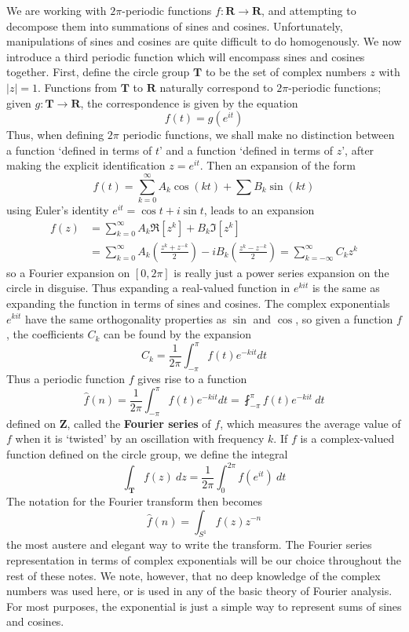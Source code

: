 We are working with $2 \pi$-periodic functions $f: \mathbf{R} \to \mathbf{R}$, and attempting to decompose them into summations of sines and cosines. Unfortunately, manipulations of sines and cosines are quite difficult to do homogenously. We now introduce a third periodic function which will encompass sines and cosines together. First, define the circle group $\mathbf{T}$ to be the set of complex numbers $z$ with $|z| = 1$. Functions from $\mathbf{T}$ to $\mathbf{R}$ naturally correspond to $2 \pi$-periodic functions; given $g: \mathbf{T} \to \mathbf{R}$, the correspondence is given by the equation
%
\[ f(t) = g(e^{it}) \]
%
Thus, when defining $2\pi$ periodic functions, we shall make no distinction between a function `defined in terms of $t$' and a function `defined in terms of $z$', after making the explicit identification $z = e^{it}$. Then an expansion of the form
%
\[ f(t) = \sum_{k = 0}^\infty A_k \cos(kt) + \sum B_k \sin(kt) \]
%
using Euler's identity $e^{it} = \cos t + i \sin t$, leads to an expansion
%
\begin{align*}
    f(z) &= \sum_{k = 0}^\infty A_k \Re[z^k] + B_k \Im[z^k]\\
    &= \sum_{k = 0}^\infty A_k \left( \frac{z^k + z^{-k}}{2} \right) - i B_k \left( \frac{z^k - z^{-k}}{2} \right) = \sum_{k = -\infty}^\infty C_k z^k
\end{align*}
%
so a Fourier expansion on $[0,2\pi]$ is really just a power series expansion on the circle in disguise. Thus expanding a real-valued function in $e^{kit}$ is the same as expanding the function in terms of sines and cosines. The complex exponentials $e^{kit}$ have the same orthogonality properties as $\sin$ and $\cos$, so given a function $f$, the coefficients $C_k$ can be found by the expansion
%
\[ C_k = \frac{1}{2\pi} \int_{-\pi}^\pi f(t) e^{-kit} dt \]
%
Thus a periodic function $f$ gives rise to a function
%
\[ \widehat{f}(n) = \frac{1}{2\pi} \int_{-\pi}^\pi f(t) e^{-kit} dt = \fint_{-\pi}^\pi f(t) e^{-kit}\ dt \]
%
defined on $\mathbf{Z}$, called the {\bf Fourier series} of $f$, which measures the average value of $f$ when it is `twisted' by an oscillation with frequency $k$. If $f$ is a complex-valued function defined on the circle group, we define the integral
%
\[ \int_{\mathbf{T}} f(z)\ dz = \frac{1}{2\pi} \int_0^{2\pi} f(e^{it})\ dt \]
%
The notation for the Fourier transform then becomes
%
\[ \widehat{f}(n) = \int_{S^1} f(z) z^{-n} \]
%
the most austere and elegant way to write the transform. The Fourier series representation in terms of complex exponentials will be our choice throughout the rest of these notes. We note, however, that no deep knowledge of the complex numbers was used here, or is used in any of the basic theory of Fourier analysis. For most purposes, the exponential is just a simple way to represent sums of sines and cosines.

